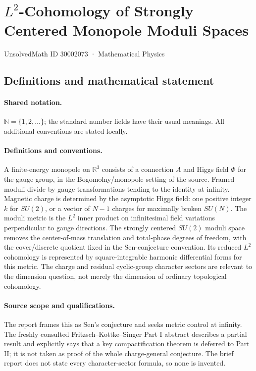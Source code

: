 \documentclass[11pt]{article}
\begin{document}
\setcounter{section}{30002072}
\section{$L^2$-Cohomology of Strongly Centered Monopole Moduli Spaces}\label{30002073}
{\small UnsolvedMath ID 30002073 · Mathematical Physics}
\subsection{Definitions and mathematical statement}

\paragraph{Shared notation.}$\mathbb N=\{1,2,\ldots\}$; the standard number fields have their usual meanings. All additional conventions are stated locally.


\paragraph{Definitions and conventions.} A finite-energy monopole on $\mathbb R^3$ consists of a connection $A$ and Higgs field $\Phi$ for the gauge group, in the Bogomolny/monopole setting of the source. Framed moduli divide by gauge transformations tending to the identity at infinity. Magnetic charge is determined by the asymptotic Higgs field: one positive integer $k$ for $SU(2)$, or a vector of $N-1$ charges for maximally broken $SU(N)$. The moduli metric is the $L^2$ inner product on infinitesimal field variations perpendicular to gauge directions. The strongly centered $SU(2)$ moduli space removes the center-of-mass translation and total-phase degrees of freedom, with the cover/discrete quotient fixed in the Sen-conjecture convention. Its reduced $L^2$ cohomology is represented by square-integrable harmonic differential forms for this metric. The charge and residual cyclic-group character sectors are relevant to the dimension question, not merely the dimension of ordinary topological cohomology.

\paragraph{Source scope and qualifications.} The report frames this as Sen's conjecture and seeks metric control at infinity. The freshly consulted Fritzsch--Kottke--Singer Part I abstract describes a partial result and explicitly says that a key compactification theorem is deferred to Part II; it is not taken as proof of the whole charge-general conjecture. The brief report does not state every character-sector formula, so none is invented.
\end{document}
